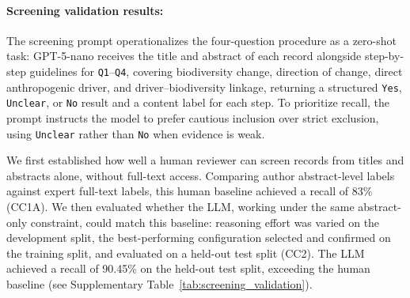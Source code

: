 \documentclass[12pt]{article}
\begin{document}
\paragraph*{Screening validation results:}
The screening prompt operationalizes the four-question procedure as a zero-shot task: GPT-5-nano receives the title and abstract of each record alongside step-by-step guidelines for \texttt{Q1}--\texttt{Q4}, covering biodiversity change, direction of change, direct anthropogenic driver, and driver--biodiversity linkage, returning a structured \texttt{Yes}, \texttt{Unclear}, or \texttt{No} result and a content label for each step. To prioritize recall, the prompt instructs the model to prefer cautious inclusion over strict exclusion, using \texttt{Unclear} rather than \texttt{No} when evidence is weak.

We first established how well a human reviewer can screen records from titles and abstracts alone, without full-text access. Comparing author abstract-level labels against expert full-text labels, this human baseline achieved a recall of 83\% (CC1A). We then evaluated whether the LLM, working under the same abstract-only constraint, could match this baseline: reasoning effort was varied on the development split, the best-performing configuration selected and confirmed on the training split, and evaluated on a held-out test split (CC2). The LLM achieved a recall of 90.45\% on the held-out test split, exceeding the human baseline (see Supplementary Table~\ref{tab:screening_validation}).
\end{document}
